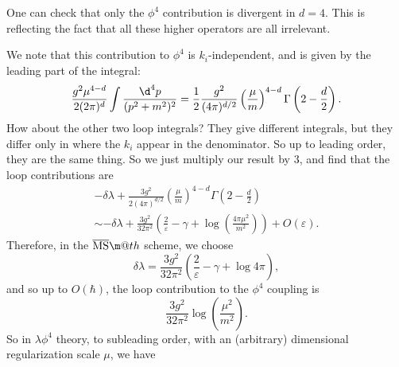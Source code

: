 \documentclass[a4paper]{article}
\makeatletter
\newcommand*{\textoverline}[1]{$\overline{\hbox{#1}}\m@th$}
\makeatother
\begin{document}
One can check that only the $\phi^4$ contribution is divergent in $d = 4$. This is reflecting the fact that all these higher operators are all irrelevant.

We note that this contribution to $\phi^4$ is $k_i$-independent, and is given by the leading part of the integral:
\[
  \frac{g^2 \mu^{4 - d}}{2(2\pi)^d} \int \frac{\d^4 p}{(p^2 + m^2)^2} = \frac{1}{2} \frac{g^2}{(4\pi)^{d/2}} \left(\frac{\mu}{m}\right)^{4 - d} \Gamma\left(2 - \frac{d}{2}\right).
\]
How about the other two loop integrals? They give different integrals, but they differ only in where the $k_i$ appear in the denominator. So up to leading order, they are the same thing. So we just multiply our result by $3$, and find that the loop contributions are
\begin{multline*}
  - \delta \lambda + \frac{3 g^2}{2(4\pi)^{d/2}} \left(\frac{\mu}{m}\right)^{4 - d} \Gamma\left(2 - \frac{d}{2}\right) \\
  \sim - \delta \lambda + \frac{3g^2}{32 \pi^2} \left(\frac{2}{\varepsilon} - \gamma + \log\left(\frac{4 \pi \mu^2}{m^2}\right)\right) + O(\varepsilon).
\end{multline*}
Therefore, in the \textoverline{MS} scheme, we choose
\[
  \delta \lambda = \frac{3g^2}{32 \pi^2}\left(\frac{2}{\varepsilon} - \gamma + \log 4\pi\right),
\]
and so up to $O(\hbar)$, the loop contribution to the $\phi^4$ coupling is
\[
  \frac{3g^2}{32 \pi^2} \log \left(\frac{\mu^2}{m^2}\right).
\]
%
So in $\lambda \phi^4$ theory, to subleading order, with an (arbitrary) dimensional regularization scale $\mu$, we have %
\end{document}
